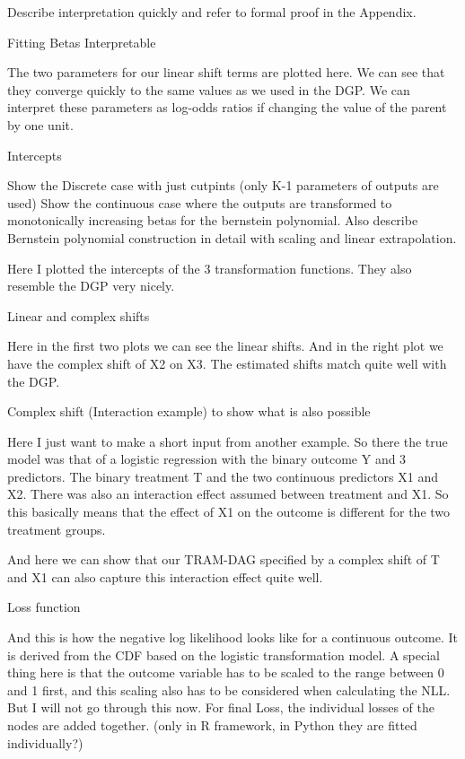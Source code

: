 Describe interpretation quickly and refer to formal proof in the Appendix.

Fitting Betas Interpretable

The two parameters for our linear shift terms are plotted here. We can see that they converge quickly to the same values as we used in the DGP. We can interpret these parameters as log-odds ratios if changing the value of the parent by one unit.

Intercepts

Show the Discrete case with just cutpints (only K-1 parameters of outputs are used)
Show the continuous case where the outputs are transformed to monotonically increasing betas for the bernstein polynomial. Also describe Bernstein polynomial construction in detail with scaling and linear extrapolation.

Here I plotted the intercepts of the 3 transformation functions. They also resemble the DGP very nicely.


Linear and complex shifts

Here in the first two plots we can see the linear shifts. And in the right plot we have the complex shift of X2 on X3. The estimated shifts match quite well with the DGP.

Complex shift (Interaction example) to show what is also possible

Here I just want to make a short input from another example. So there the true model was that of a logistic regression with the binary outcome Y and 3 predictors. The binary treatment T and the two continuous predictors X1 and X2. There was also an interaction effect assumed between treatment and X1. So this basically means that the effect of X1 on the outcome is different for the two treatment groups.

And here we can show that our TRAM-DAG specified by a complex shift of T and X1 can also capture this interaction effect quite well.


Loss function

And this is how the negative log likelihood looks like for a continuous outcome. It is derived from the CDF based on the logistic transformation model. A special thing here is that the outcome variable has to be scaled to the range between 0 and 1 first, and this scaling also has to be considered when calculating the NLL. But I will not go through this now.
For final Loss, the individual losses of the nodes are added together. (only in R framework, in Python they are fitted individually?)


